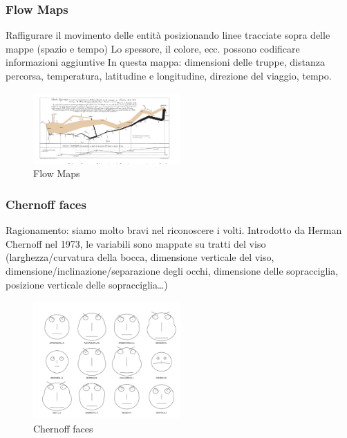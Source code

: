 \subsubsection{Flow Maps}

Raffigurare il movimento delle entità posizionando linee tracciate sopra delle mappe (spazio e tempo)
Lo spessore, il colore, ecc. possono codificare informazioni aggiuntive
In questa mappa: dimensioni delle truppe, distanza percorsa, temperatura, latitudine e longitudine, direzione del viaggio, tempo.
\begin{figure}[H]
    \centering
    \includegraphics[width=0.5\textwidth]{images/FlowMaps.png}
    \caption{Flow Maps}
    \label{fig:immagine}
\end{figure}
\subsubsection{Chernoff faces}
Ragionamento: siamo molto bravi nel riconoscere i volti.
Introdotto da Herman Chernoff nel 1973, le variabili sono mappate su tratti del viso
(larghezza/curvatura della bocca, dimensione verticale del viso, dimensione/inclinazione/separazione degli occhi, dimensione delle sopracciglia, posizione verticale delle sopracciglia…)
\begin{figure}[H]
    \centering
    \includegraphics[width=0.5\textwidth]{images/Chernofffaces.png} 
    \caption{Chernoff faces}
    \label{fig:immagine}
\end{figure}
